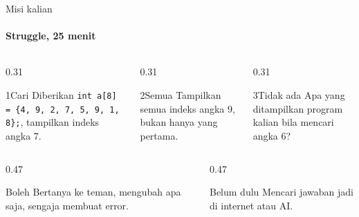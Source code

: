 \documentclass[t]{beamer}
\begin{document}
\begin{frame}{Misi kalian}
\framesubtitle{Struggle, 25 menit}
\begin{columns}[T]
\begin{column}{0.31\textwidth}
\begin{Langkah}{1}{Cari}
Diberikan \texttt{int a[8] = \{4, 9, 2, 7, 5, 9, 1, 8\};}, tampilkan indeks angka 7.
\end{Langkah}
\end{column}
\begin{column}{0.31\textwidth}
\begin{Langkah}{2}{Semua}
Tampilkan semua indeks angka 9, bukan hanya yang pertama.
\end{Langkah}
\end{column}
\begin{column}{0.31\textwidth}
\begin{Langkah}{3}{Tidak ada}
Apa yang ditampilkan program kalian bila mencari angka 6?
\end{Langkah}
\end{column}
\end{columns}
\vspace{8pt}
\begin{columns}[T]
\begin{column}{0.47\textwidth}
\begin{Blok}{Boleh}
Bertanya ke teman, mengubah apa saja, sengaja membuat error.
\end{Blok}
\end{column}
\begin{column}{0.47\textwidth}
\begin{BlokAlert}{Belum dulu}
Mencari jawaban jadi di internet atau AI.
\end{BlokAlert}
\end{column}
\end{columns}
\end{frame}
\end{document}
